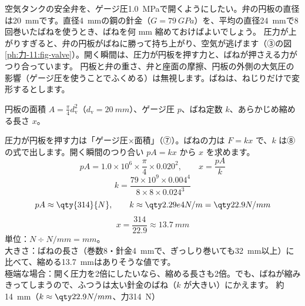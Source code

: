 \begin{phreidai}
\label{ph:力-11:ex14}空気タンクの安全弁を、ゲージ圧\qty{1.0}{MPa}で開くようにしたい。弁の円板の直径は\qty{20}{mm}です。直径\qty{4}{mm}の鋼の針金（$G=\qty{79}{GPa}$）を、平均の直径\qty{24}{mm}で8回巻いたばねを使うとき、ばねを何 mm 縮めておけばよいでしょう。
\phbamen
圧力が上がりすぎると、弁の円板がばねに勝って持ち上がり、空気が逃げます（③の図\ref{ph:力-11:fig-valve}）。開く瞬間は、圧力が円板を押す力と、ばねが押さえる力がつり合っています。
\phmushi
円板と弁の重さ、弁と座面の摩擦、円板の外側の大気圧の影響（ゲージ圧を使うことでふくめる）は無視します。ばねは、ねじりだけで変形するとします。
\phzu
\noindent\begin{minipage}[c]{0.58\linewidth}
円板の面積 $A=\tfrac{\pi}{4}d_{\mathrm v}^2$（$d_{\mathrm v}=\qty{20}{mm}$）、ゲージ圧 $p$、ばね定数 $k$、あらかじめ縮める長さ $x$。
\end{minipage}\hfill
\begin{minipage}[c]{0.38\linewidth}
\centering
{}
\label{ph:力-11:fig-valve}
\end{minipage}
\phriyu
圧力が円板を押す力は「ゲージ圧×面積」（⑦）。ばねの力は $F=kx$ で、$k$ は⑧の式で出します。開く瞬間のつり合い $pA=kx$ から $x$ を求めます。
\phtateru
\[ pA=1.0\times10^6\times\frac{\pi}{4}\times0.020^2,\qquad x=\frac{pA}{k} \]
\[ k=\frac{79\times10^9\times0.004^4}{8\times8\times0.024^3} \]
\phtoku
\[ pA\approx\qty{314}{N},\qquad k\approx\pxlq{2.29e4}{N/m}=\pxlq{22.9}{N/mm} \]
\[ x=\frac{314}{22.9}\approx\qty{13.7}{mm} \]
\phtashikame
単位：$\unit{N}\div\unit{N/mm}=\unit{mm}$。\\
大きさ：ばねの長さ（巻数8・針金\qty{4}{mm}で、ぎっしり巻いても\qty{32}{mm}以上）に比べて、縮める\qty{13.7}{mm}はありそうな値です。\\
極端な場合：開く圧力を2倍にしたいなら、縮める長さも2倍。でも、ばねが縮みきってしまうので、ふつうは太い針金のばね（$k$ が大きい）にかえます。
\kotae 約\qty{14}{mm}（$k\approx\pxlq{22.9}{N/mm}$、力\qty{314}{N}）
\end{phreidai}
